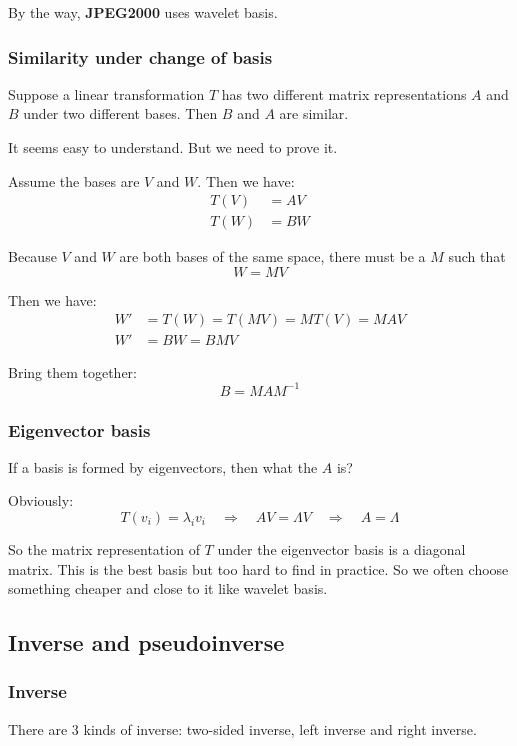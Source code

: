 \documentclass[12pt]{ctexart}
\begin{document}
By the way, \textbf{JPEG2000} uses wavelet basis.

\subsubsection{\textbf{Similarity under change of basis}}

Suppose a linear transformation $T$ has two different matrix representations $A$ and $B$
under two different bases. Then $B$ and $A$ are similar.

It seems easy to understand. But we need to prove it.

Assume the bases are $V$ and $W$. Then we have:
\begin{align*}
  T(V) &= AV \\
  T(W) &= BW
\end{align*}

Because $V$ and $W$ are both bases of the same space, there must be a $M$ such that
\[
  W = MV
\]

Then we have:
\begin{align*}
  W' &= T(W) = T(MV) = M T(V) = MAV \\
  W' &= BW = BMV
\end{align*}

Bring them together:
\[
  B = MAM^{-1}
\]

\subsubsection{\textbf{Eigenvector basis}}

If a basis is formed by eigenvectors, then what the $A$ is?

Obviously:
\[
  T(v_i) = \lambda_i v_i \quad \Rightarrow \quad
  AV = \Lambda V \quad \Rightarrow \quad
  A = \Lambda
\]

So the matrix representation of $T$ under the eigenvector basis is a diagonal matrix.
This is the best basis but too hard to find in practice. So we often choose something cheaper
and close to it like wavelet basis.

\subsection{\textbf{Inverse and pseudoinverse}}
\subsubsection{\textbf{Inverse}}
There are 3 kinds of inverse: two-sided inverse, left inverse and right inverse.
\end{document}
